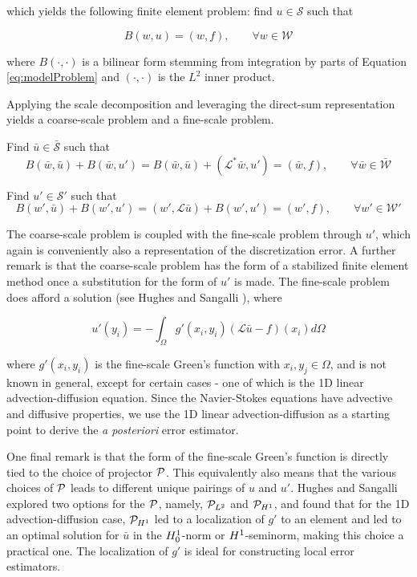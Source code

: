 \noindent which yields the following finite element problem:
find $u \in \mathcal{S}$ such that

\begin{equation}
    B(w,u) = (w,f), \qquad \forall w \in \mathcal{W}
\end{equation} 

\noindent where $B(\cdot,\cdot)$ is a bilinear form stemming from integration by parts of Equation \ref{eq:modelProblem} and $(\cdot,\cdot)$ is the $L^2$ inner product.

Applying the scale decomposition and leveraging the direct-sum representation yields a coarse-scale problem and a fine-scale problem.

Find $\bar{u} \in \bar{\mathcal{S}}$ such that
\begin{equation}
    B(\bar{w},\bar{u}) + B(\bar{w},u') = B(\bar{w},\bar{u}) + (\mathcal{L}^{*}\bar{w},u') = (\bar{w},f), \qquad \forall \bar{w} \in \bar{\mathcal{W}}
\end{equation} 

Find $u' \in \mathcal{S}'$ such that
\begin{equation}
    B(w',\bar{u}) + B(w',u') = (w',\mathcal{L}\bar{u}) + B(w',u') = (w',f), \qquad \forall w' \in \mathcal{W}'
    \label{eq:fineScale}
\end{equation}

The coarse-scale problem is coupled with the fine-scale problem through $u'$, which again is conveniently also a representation of the discretization error.
A further remark is that the coarse-scale problem has the form of a stabilized finite element method once a substitution for the form of $u'$ is made.
The fine-scale problem does afford a solution (see Hughes and Sangalli \cite{hughes2007variational}), where

\begin{equation}
    u'(y_i) = -\int_{\Omega} g'(x_i,y_i)(\mathcal{L}\bar{u}-f)(x_i) d\Omega
    \label{eq:uPrimeSoln}
\end{equation} 

\noindent where $g'(x_i,y_i)$ is the fine-scale Green's function with $x_i,y_j \in \Omega$, and is not known in general, except for certain cases - one of which is the 1D linear advection-diffusion equation.
Since the Navier-Stokes equations have advective and diffusive properties, we use the 1D linear advection-diffusion as a starting point to derive the \textit{a posteriori} error estimator.

One final remark is that the form of the fine-scale Green's function is directly tied to the choice of projector $\mathcal{P}$.
This equivalently also means that the various choices of $\mathcal{P}$ leads to different unique pairings of $u$ and $u'$.
Hughes and Sangalli \cite{hughes2007variational} explored two options for the $\mathcal{P}$, namely, $\mathcal{P}_{L^2}$ and $\mathcal{P}_{H^1}$, and found that for the 1D advection-diffusion case, $\mathcal{P}_{H^1}$ led to a localization of $g'$ to an element and led to an optimal solution for $\bar{u}$ in the $H^{1}_0$-norm or $H^{1}$-seminorm, making this choice a practical one.
The localization of $g'$ is ideal for constructing local error estimators.

